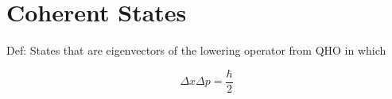 \documentclass[12pt]{article}
\begin{document}
\setlength{\parindent}{0 pt}

\section{Coherent States}

Def: States that are eigenvectors of the lowering operator from QHO in which

\[
\Delta x \Delta p = \frac{\hbar}{2}
\]
\end{document}
